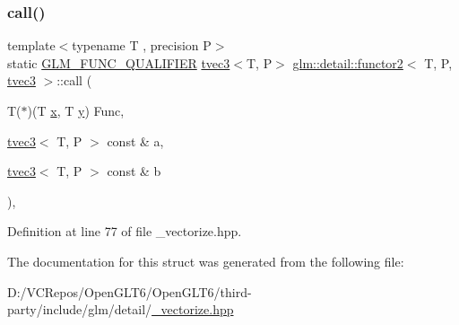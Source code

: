 \subsubsection{\texorpdfstring{call()}{call()}}
{\footnotesize\ttfamily template$<$typename T , precision P$>$ \\
static \mbox{\hyperlink{setup_8hpp_a33fdea6f91c5f834105f7415e2a64407}{G\+L\+M\+\_\+\+F\+U\+N\+C\+\_\+\+Q\+U\+A\+L\+I\+F\+I\+ER}} \mbox{\hyperlink{structglm_1_1tvec3}{tvec3}}$<$T, P$>$ \mbox{\hyperlink{structglm_1_1detail_1_1functor2}{glm\+::detail\+::functor2}}$<$ T, P, \mbox{\hyperlink{structglm_1_1tvec3}{tvec3}} $>$\+::call (\begin{DoxyParamCaption}\item[{T($\ast$)(T \mbox{\hyperlink{glad_8h_a92d0386e5c19fb81ea88c9f99644ab1d}{x}}, T \mbox{\hyperlink{glad_8h_a66ddd433d2cacfe27f5906b7e86faeed}{y}})}]{Func,  }\item[{\mbox{\hyperlink{structglm_1_1tvec3}{tvec3}}$<$ T, P $>$ const \&}]{a,  }\item[{\mbox{\hyperlink{structglm_1_1tvec3}{tvec3}}$<$ T, P $>$ const \&}]{b }\end{DoxyParamCaption})\hspace{0.3cm}{\ttfamily [inline]}, {\ttfamily [static]}}



Definition at line 77 of file \+\_\+vectorize.\+hpp.



The documentation for this struct was generated from the following file\+:\begin{DoxyCompactItemize}
\item 
D\+:/\+V\+C\+Repos/\+Open\+G\+L\+T6/\+Open\+G\+L\+T6/third-\/party/include/glm/detail/\mbox{\hyperlink{__vectorize_8hpp}{\+\_\+vectorize.\+hpp}}\end{DoxyCompactItemize}
